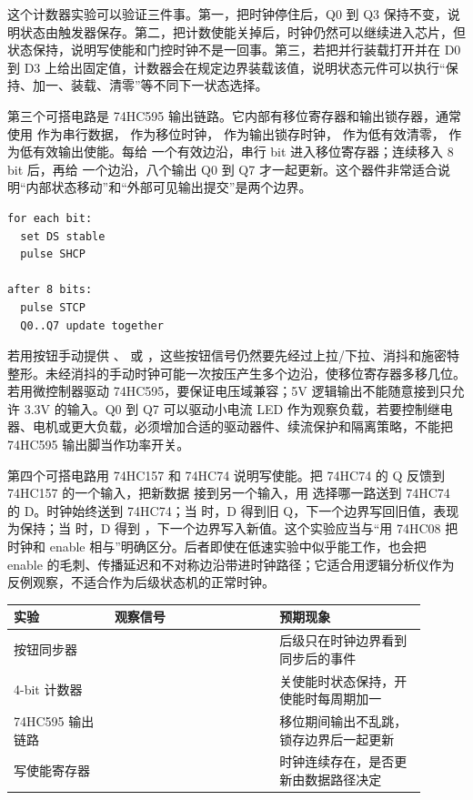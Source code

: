 这个计数器实验可以验证三件事。第一，把时钟停住后，Q0 到 Q3 保持不变，说明状态由触发器保存。第二，把计数使能关掉后，时钟仍然可以继续进入芯片，但状态保持，说明写使能和门控时钟不是一回事。第三，若把并行装载打开并在 D0 到 D3 上给出固定值，计数器会在规定边界装载该值，说明状态元件可以执行“保持、加一、装载、清零”等不同下一状态选择。

第三个可搭电路是 74HC595 输出链路。它内部有移位寄存器和输出锁存器，通常使用  作为串行数据， 作为移位时钟， 作为输出锁存时钟， 作为低有效清零， 作为低有效输出使能。每给  一个有效边沿，串行 bit 进入移位寄存器；连续移入 8 bit 后，再给  一个边沿，八个输出 Q0 到 Q7 才一起更新。这个器件非常适合说明“内部状态移动”和“外部可见输出提交”是两个边界。

\begin{lstlisting}
for each bit:
  set DS stable
  pulse SHCP

after 8 bits:
  pulse STCP
  Q0..Q7 update together
\end{lstlisting}

若用按钮手动提供 、 或 ，这些按钮信号仍然要先经过上拉/下拉、消抖和施密特整形。未经消抖的手动时钟可能一次按压产生多个边沿，使移位寄存器多移几位。若用微控制器驱动 74HC595，要保证电压域兼容；5V 逻辑输出不能随意接到只允许 3.3V 的输入。Q0 到 Q7 可以驱动小电流 LED 作为观察负载，若要控制继电器、电机或更大负载，必须增加合适的驱动器件、续流保护和隔离策略，不能把 74HC595 输出脚当作功率开关。

第四个可搭电路用 74HC157 和 74HC74 说明写使能。把 74HC74 的 Q 反馈到 74HC157 的一个输入，把新数据  接到另一个输入，用  选择哪一路送到 74HC74 的 D。时钟始终送到 74HC74；当  时，D 得到旧 Q，下一个边界写回旧值，表现为保持；当  时，D 得到 ，下一个边界写入新值。这个实验应当与“用 74HC08 把时钟和 enable 相与”明确区分。后者即使在低速实验中似乎能工作，也会把 enable 的毛刺、传播延迟和不对称边沿带进时钟路径；它适合用逻辑分析仪作为反例观察，不适合作为后级状态机的正常时钟。

\begin{longtable}{L{0.22\linewidth}L{0.36\linewidth}L{0.32\linewidth}}
\toprule
实验 & 观察信号 & 预期现象 \\
\midrule
按钮同步器 &  & 后级只在时钟边界看到同步后的事件 \\
4-bit 计数器 &  & 关使能时状态保持，开使能时每周期加一 \\
74HC595 输出链路 &  & 移位期间输出不乱跳，锁存边界后一起更新 \\
写使能寄存器 &  & 时钟连续存在，是否更新由数据路径决定 \\
\bottomrule
\end{longtable}

